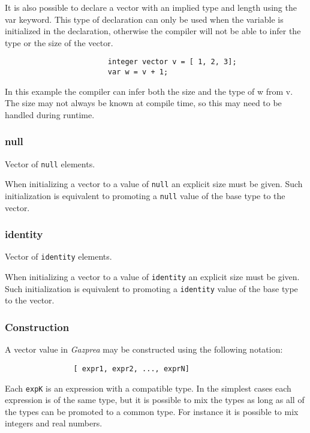 \documentclass[../../gazprea.tex]{subfiles}
\begin{document}
\begin{enumerate}
					It is also possible to declare a vector with an implied type and length using the var keyword. This
					type of declaration can only be used when the variable is initialized in the declaration, otherwise
					the compiler will not be able to infer the type or the size of the vector.

					\begin{lstlisting}
						integer vector v = [ 1, 2, 3];
						var w = v + 1;
					\end{lstlisting}
					In this example the compiler can infer both the size and the type of w from v. The size may not
					always be known at compile time, so this may need to be handled during runtime.

			\end{enumerate}

		\subsubsection{null}

			Vector of \texttt{null} elements.

			When initializing a vector to a value of \texttt{null} an explicit size must be given. Such initialization
			is equivalent to promoting a \texttt{null} value of the base type to the vector.

		\subsubsection{identity}

			Vector of \texttt{identity} elements.

			When initializing a vector to a value of \texttt{identity} an explicit size must be given. Such
			initialization is equivalent to promoting a \texttt{identity} value of the base type to the vector.

		\subsubsection{Construction}

			A vector value in \textit{Gazprea} may be constructed using the following notation:

			\begin{lstlisting}
				[ expr1, expr2, ..., exprN]
			\end{lstlisting}

			Each \texttt{expK} is an expression with a compatible type. In the simplest cases each expression is of the
			same type, but it is possible to mix the types as long as all of the types can be promoted to a common type.
			For instance it is possible to mix integers and real numbers.
\end{document}
